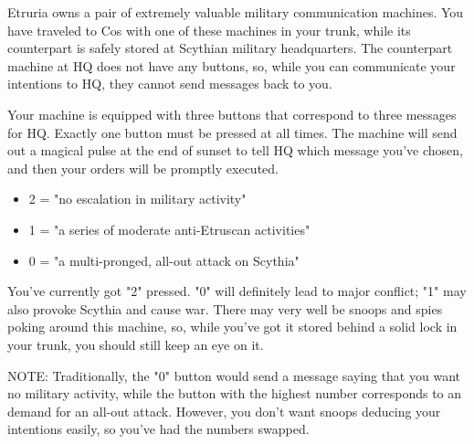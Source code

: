 \documentclass[green]{Kos}
\begin{document}
\name{\gEtruriaMachine{}}

Etruria owns a pair of extremely valuable military communication machines. You have traveled to Cos with one of these machines in your trunk, while its counterpart is safely stored at Scythian military headquarters. The counterpart machine at HQ does not have any buttons, so, while you can communicate your intentions to HQ, they cannot send messages back to you. 

Your machine is equipped with three buttons that correspond to three messages for HQ. Exactly one button must be pressed at all times. The machine will send out a magical pulse at the end of sunset to tell HQ which message you've chosen, and then your orders will be promptly executed.

\begin{itemize}
\item 2 = "no escalation in military activity"
\item 1 = "a series of moderate anti-Etruscan activities"
\item 0 = "a multi-pronged, all-out attack on Scythia"
\end{itemize}


You've currently got "2" pressed. "0" will definitely lead to major conflict; "1" may also provoke Scythia and cause war. There may very well be snoops and spies poking around this machine, so, while you've got it stored behind a solid lock in your trunk, you should still keep an eye on it.

NOTE: Traditionally, the "0" button would send a message saying that you want no military activity, while the button with the highest number corresponds to an demand for an all-out attack. However, you don't want snoops deducing your intentions easily, so you've had the numbers swapped.
\end{document}
